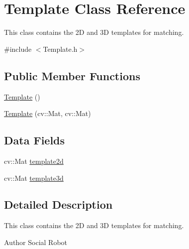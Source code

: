 \hypertarget{classTemplate}{\section{Template Class Reference}
\label{classTemplate}
}


This class contains the 2\-D and 3\-D templates for matching.  




{\ttfamily \#include $<$Template.\-h$>$}

\subsection*{Public Member Functions}
\begin{DoxyCompactItemize}
\item 
\hyperlink{classTemplate_afea5166b9ca0022fe21c2ed4882c161a}{Template} ()
\item 
\hyperlink{classTemplate_a9234aea5815f2a8d8bde56f635b2d2f3}{Template} (cv\-::\-Mat, cv\-::\-Mat)
\end{DoxyCompactItemize}
\subsection*{Data Fields}
\begin{DoxyCompactItemize}
\item 
cv\-::\-Mat \hyperlink{classTemplate_a65d3e446fb6ac165be19da2d747e85ed}{template2d}
\item 
cv\-::\-Mat \hyperlink{classTemplate_a27b16dc049359b1ac3ee24b08841ba56}{template3d}
\end{DoxyCompactItemize}


\subsection{Detailed Description}
This class contains the 2\-D and 3\-D templates for matching. 

\begin{DoxyAuthor}{Author}
Social Robot 
\end{DoxyAuthor}


